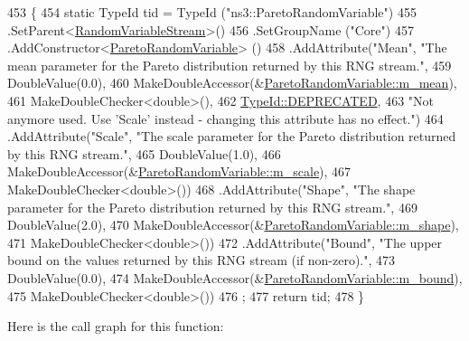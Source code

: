 \begin{DoxyCode}
453 \{
454   \textcolor{keyword}{static} TypeId tid = TypeId (\textcolor{stringliteral}{"ns3::ParetoRandomVariable"})
455     .SetParent<\hyperlink{classns3_1_1RandomVariableStream_ab6dd72fd15a0043b678ff56ac326b233}{RandomVariableStream}>()
456     .SetGroupName (\textcolor{stringliteral}{"Core"})
457     .AddConstructor<\hyperlink{classns3_1_1ParetoRandomVariable_a382e7b2687861ed6dd5e25ddea67d69f}{ParetoRandomVariable}> ()
458     .AddAttribute(\textcolor{stringliteral}{"Mean"}, \textcolor{stringliteral}{"The mean parameter for the Pareto distribution returned by this RNG stream."},
459       DoubleValue(0.0),
460       MakeDoubleAccessor(&\hyperlink{classns3_1_1ParetoRandomVariable_a6d245bceabbb307777a942674433ee39}{ParetoRandomVariable::m\_mean}),
461       MakeDoubleChecker<double>(),
462       \hyperlink{classns3_1_1TypeId_ad55d31e57490a83a3ededa096a8d2588aa50cc8669d91c8449f81557ffa5d2024}{TypeId::DEPRECATED},
463       \textcolor{stringliteral}{"Not anymore used. Use 'Scale' instead - changing this attribute has no effect."})
464     .AddAttribute(\textcolor{stringliteral}{"Scale"}, \textcolor{stringliteral}{"The scale parameter for the Pareto distribution returned by this RNG stream."},
465       DoubleValue(1.0),
466       MakeDoubleAccessor(&\hyperlink{classns3_1_1ParetoRandomVariable_a2c52677237cc9bce3c01ea0052444d81}{ParetoRandomVariable::m\_scale}),
467       MakeDoubleChecker<double>())
468     .AddAttribute(\textcolor{stringliteral}{"Shape"}, \textcolor{stringliteral}{"The shape parameter for the Pareto distribution returned by this RNG stream."},
469                   DoubleValue(2.0),
470                   MakeDoubleAccessor(&\hyperlink{classns3_1_1ParetoRandomVariable_a606ababe260201098981f88c30fa8b39}{ParetoRandomVariable::m\_shape}),
471                   MakeDoubleChecker<double>())
472     .AddAttribute(\textcolor{stringliteral}{"Bound"}, \textcolor{stringliteral}{"The upper bound on the values returned by this RNG stream (if non-zero)."},
473                   DoubleValue(0.0),
474                   MakeDoubleAccessor(&\hyperlink{classns3_1_1ParetoRandomVariable_ab9bf62721171d3bc401081cdaa22e1b7}{ParetoRandomVariable::m\_bound}),
475                   MakeDoubleChecker<double>())
476     ;
477   \textcolor{keywordflow}{return} tid;
478 \}
\end{DoxyCode}


Here is the call graph for this function\+:


